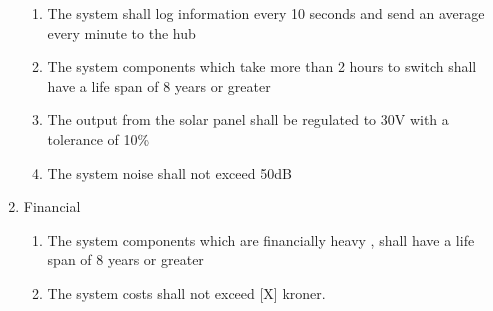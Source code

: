 \documentclass[12pt,a4paper]{report}
\begin{document}
\begin{enumerate}
\begin{enumerate}
	\item	The system shall log information every 10 seconds and send an average every minute to the hub
	\item	The system components which take more than 2 hours to switch shall have a life span of 8 years or greater
	\item	The output from the solar panel shall be regulated to 30V with a tolerance of 10\%
	\item	The system noise shall not exceed 50dB
\end{enumerate}
\item	Financial
\begin{enumerate}
	\item	The system components which are financially heavy , shall have a life span of 8 years or greater
	\item	The system costs shall not exceed [X] kroner.
\end{enumerate}
\end{enumerate}

\end{document}
